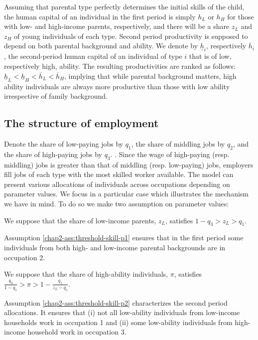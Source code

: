 Assuming that parental type perfectly determines the initial skills of the child, the human capital of an individual in the first period is simply $h_L$ or $h_H$ for those with low- and high-income parents, respectively, and there will be a share $z_L$  and $z_H$ of young individuals of each type. Second period productivity is supposed to depend on both parental background and ability. We denote by $\underline{h}_i$, respectively $\overline{h}_i$, the second-period human capital of an individual of type $i$ that is of low, respectively high, ability. The resulting productivities are ranked as follows: $\underline{h}_L < \underline{h}_H < \overline{h}_L < \overline{h}_H$, implying that while parental background matters, high ability individuals are always more productive than those with low ability irrespective of family background. 

\subsection{The structure of employment} \label{chap2-model-structure}

Denote the share of low-paying jobs by $q_1$, the share of middling jobs by $q_2$, and the share of high-paying jobs by $q_3$. . Since the wage of high-paying (resp. middling) jobs is greater than that of middling (resp. low-paying) jobs, employers fill jobs of each type with the most skilled worker available. 
The model can present various allocations of individuals across occupations depending on parameter values. We focus in a particular case which illustrates the mechanism we have in mind. To do so we make two assumption on parameter values:
\begin{assumption}\label{chap2-ass:threshold-skill-p1}
We suppose that the share of low-income parents, $z_L$, satisfies $1-q_3 > z_L > q_1$.
\end{assumption}
Assumption \ref{chap2-ass:threshold-skill-p1} ensures that in the first period some individuals from both high- and low-income parental backgrounds are in occupation 2.
\begin{assumption}\label{chap2-ass:threshold-skill-p2}
We suppose that the share of high-ability individuals, $\pi$, satisfies $ \frac{q_3}{1-q_1} > \pi > 1- \frac{q_1}{z_L-q_1} $.
\end{assumption}
Assumption \ref{chap2-ass:threshold-skill-p2} characterizes the second period allocations. It ensures that (i) not all low-ability individuals from low-income households work in occupation 1 and (ii) some low-ability individuals from high-income household work in occupation 3. 

